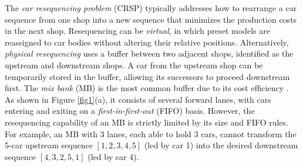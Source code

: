 \documentclass[12pt]{article}
\begin{document}
The \textit{car resequencing problem} (CRSP) typically addresses how to rearrange a car sequence from one shop into a new sequence that minimizes the production costs in the next shop. Resequencing can be \textit{virtual}, in which preset models are reassigned to car bodies without altering their relative positions. Alternatively, \textit{physical resequencing} uses a buffer between two adjacent shops, identified as the upstream and downstream shops. A car from the upstream shop can be temporarily stored in the buffer, allowing its successors to proceed downstream first. The \textit{mix bank} (MB) is the most common buffer due to its cost efficiency \citep{taube2018resequencing}. As shown in Figure \ref{fig1}(a), it consists of several forward lanes, with cars entering and exiting on a \textit{first-in-first-out} (FIFO) basis. However, the resequencing capability of an MB is strictly limited by its size and FIFO rules. For example, an MB with 3 lanes, each able to hold 3 cars, cannot transform the 5-car upstream sequence $[1,2,3,4,5]$ (led by car 1) into the desired downstream sequence $[4,3,2,5,1]$ (led by car 4).


\end{document}
